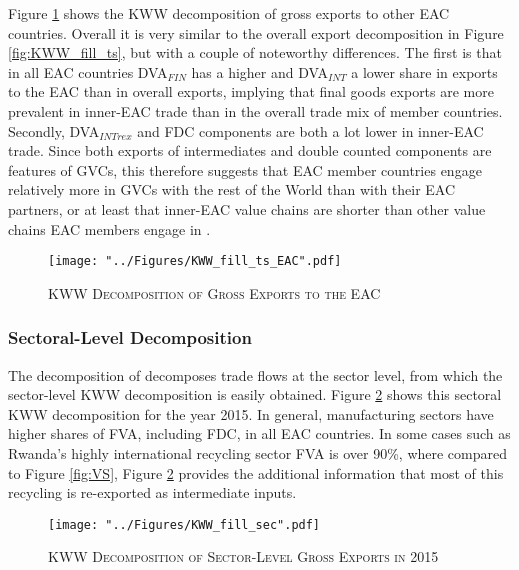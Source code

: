 \documentclass[a4paper]{article}
\begin{document}
Figure \ref{fig:KWW_fill_ts_EAC} shows the KWW decomposition of gross exports to other EAC countries. Overall it is very similar to the overall export decomposition in Figure \ref{fig:KWW_fill_ts}, but with a couple of noteworthy differences. The first is that in all EAC countries DVA$_{FIN}$ has a higher and DVA$_{INT}$ a lower share in exports to the EAC than in overall exports, implying that final goods exports are more prevalent in inner-EAC trade than in the overall trade mix of member countries. Secondly, DVA$_{INTrex}$ and FDC components are both a lot lower in inner-EAC trade. Since both exports of intermediates and double counted components are features of GVCs, this therefore suggests that EAC member countries engage relatively more in GVCs with the rest of the World than with their EAC partners, or at least that inner-EAC value chains are shorter than other value chains EAC members engage in \citep{Kummritz20162}. 
\newpage

\begin{figure}[h!] \vspace{-1cm}
\centering
\caption{\label{fig:KWW_fill_ts_EAC}\textsc{KWW Decomposition of Gross Exports to the EAC}}
\texttt{[image: "../Figures/KWW\_fill\_ts\_EAC".pdf]} %
\vspace{-0.8cm}
\end{figure}
\FloatBarrier

\subsubsection{Sectoral-Level Decomposition}
The decomposition of \citet{wang2013quantifying} decomposes trade flows at the sector level, from which the sector-level KWW decomposition is easily obtained. Figure \ref{fig:KWW_fill_sec} shows this sectoral KWW decomposition for the year 2015. In general, manufacturing sectors have higher shares of FVA, including FDC, in all EAC countries. In some cases such as Rwanda's highly international recycling sector FVA is over 90\%, where compared to Figure \ref{fig:VS}, Figure \ref{fig:KWW_fill_sec} provides the additional information that most of this recycling is re-exported as intermediate inputs.  

\begin{figure}[h!] \vspace{-0.1cm}
\centering
\caption{\label{fig:KWW_fill_sec}\textsc{KWW Decomposition of Sector-Level Gross Exports in 2015}}
\texttt{[image: "../Figures/KWW\_fill\_sec".pdf]} %
\vspace{-1.5cm}
\end{figure}
\FloatBarrier
\newpage
\end{document}
